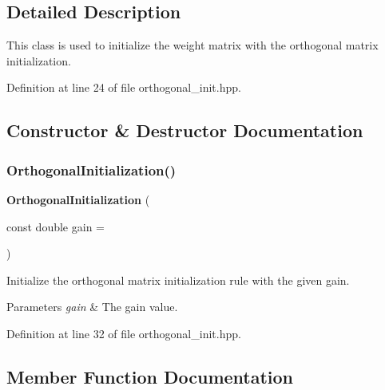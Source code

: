 \subsection{Detailed Description}
This class is used to initialize the weight matrix with the orthogonal matrix initialization. 

Definition at line 24 of file orthogonal\+\_\+init.\+hpp.



\subsection{Constructor \& Destructor Documentation}
\mbox{\label{classmlpack_1_1ann_1_1OrthogonalInitialization_a817ae9d4d72deee10477cb6e79dc535a}} 
\subsubsection{Orthogonal\+Initialization()}
{\footnotesize\ttfamily \textbf{ Orthogonal\+Initialization} (\begin{DoxyParamCaption}\item[{const double}]{gain = {} }\end{DoxyParamCaption})\hspace{0.3cm}{\ttfamily [inline]}}



Initialize the orthogonal matrix initialization rule with the given gain. 


\begin{DoxyParams}{Parameters}
{\em gain} & The gain value. \\
\hline
\end{DoxyParams}


Definition at line 32 of file orthogonal\+\_\+init.\+hpp.



\subsection{Member Function Documentation}
\mbox{\label{classmlpack_1_1ann_1_1OrthogonalInitialization_a5cfe472251a41fffd45b170bb0d3c1bd}} 
